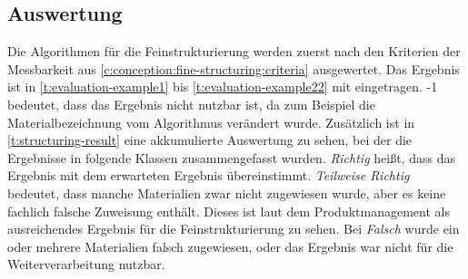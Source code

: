 \subsection{Auswertung}
\label{c:comparison:fine-structuring:evaluation}
Die Algorithmen für die Feinstrukturierung werden zuerst nach den Kriterien der Messbarkeit aus \autoref{c:conception:fine-structuring:criteria} ausgewertet.
Das Ergebnis ist in \autoref{t:evaluation-example1} bis \autoref{t:evaluation-example22} mit eingetragen. -1 bedeutet, dass das Ergebnis nicht nutzbar ist, da zum Beispiel die Materialbezeichnung vom Algorithmus verändert wurde. Zusätzlich ist in \autoref{t:structuring-result} eine akkumulierte Auswertung zu sehen, bei der die Ergebnisse in folgende Klassen zusammengefasst wurden. \textit{Richtig} heißt, dass das Ergebnis mit dem erwarteten Ergebnis übereinstimmt. \textit{Teilweise Richtig} bedeutet, dass manche Materialien zwar nicht zugewiesen wurde, aber es keine fachlich falsche Zuweisung enthält. Dieses ist laut dem Produktmanagement als ausreichendes Ergebnis für die Feinstrukturierung zu sehen.  Bei \textit{Falsch} wurde ein oder mehrere Materialien falsch zugewiesen, oder das Ergebnis war nicht für die Weiterverarbeitung nutzbar. 



